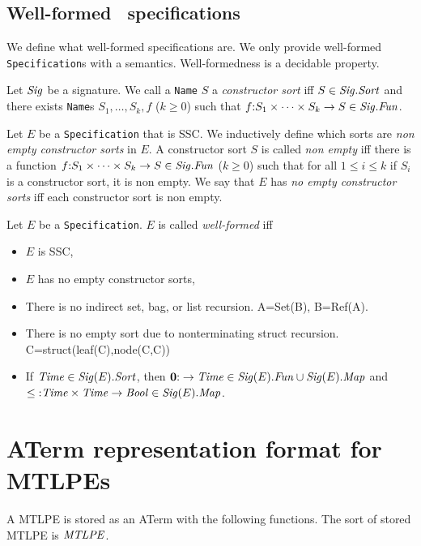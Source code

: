 \documentclass[fleqn,a4paper,dvips]{article}
\newcommand{\Sig}{\nm{Sig}}
\newcommand{\Fun}{\nm{Fun}}
\newcommand{\nul}{{\bf 0}}
\begin{document}
\subsection{Well-formed \mcrl\ specifications}
We define what well-formed specifications are. We only provide
well-formed {\tt Specification}s with a semantics. Well-formedness
is a decidable property.
\begin{defn}
Let $\Sig$ be a signature. We call a {\tt Name} $S$ a {\it constructor sort}
iff $S\in\Sig.\Sort$ and there exists {\tt Name}s $S_1,\ldots, S_k, f$ ($k\geq 0$)
such that $f\ap S_1\times \cdots\times S_k\rightarrow S\in \Sig.\Fun$.
\end{defn}
\begin{defn}
Let $E$ be a {\tt Specification} that is SSC. 
We inductively define which sorts are {\it non empty constructor sorts} in $E$.
A constructor sort $S$ is called {\it non empty} iff there is a function
$f\ap S_1\times\cdots\times S_k\rightarrow S\in \Sig.\Fun$ ($k\geq 0$) such
that for all $1\leq i\leq k$ if $S_i$ is a constructor sort, it is non empty.
We say
that $E$ has {\em no empty constructor sorts} iff each constructor sort is non
empty.
\end{defn}
\begin{defn}
Let $E$ be a {\tt Specification}. $E$ is called {\it well-formed} iff 
\begin{itemize}
\item $E$ is SSC, 
\item $E$ has no empty constructor sorts,
\item There is no indirect set, bag, or list recursion. A=Set(B), B=Ref(A).
\item There is no empty sort due to nonterminating struct recursion.
  C=struct(leaf(C),node(C,C))
\item If $\Time\in\Sig(E).\Sort$, then $\nul\ap \rightarrow\Time\in\Sig(E).\Fun\cup \Sig(E).\Map$
  and $\leq\ap\Time\times\Time\rightarrow\Bool\in \Sig(E).\Map$.
\end{itemize}
\end{defn}

\newpage
\section{ATerm representation format for MTLPEs}
A MTLPE is stored as an ATerm with the following functions. The sort
of stored MTLPE is $\mathit{MTLPE}$.
\end{document}
